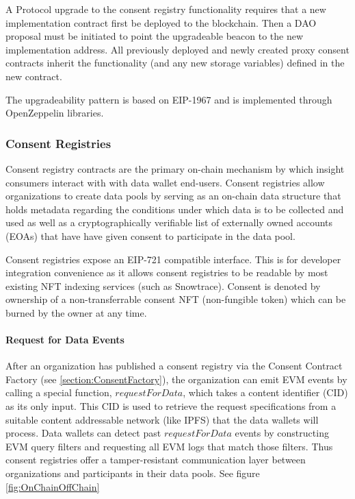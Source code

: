 A Protocol upgrade to the consent registry functionality requires that a new implementation contract first be deployed to the blockchain. Then a 
DAO proposal must be initiated to point the upgradeable beacon to the new implementation address. All previously deployed and newly created proxy 
consent contracts inherit the functionality (and any new storage variables) defined in the new contract.

The upgradeability pattern is based on EIP-1967 and is implemented through OpenZeppelin libraries.

\subsubsection{Consent Registries}
\label{section:ConsentContract}


Consent registry contracts are the primary on-chain mechanism by which insight consumers interact with with data wallet end-users. Consent 
registries allow organizations to create data pools by serving as an on-chain data structure that holds metadata regarding the conditions 
under which data is to be collected and used as well as a cryptographically verifiable list of externally owned accounts (EOAs) that have
have given consent to participate in the data pool. 

Consent registries expose an EIP-721 compatible interface. This is for developer integration convenience as it allows consent registries to 
be readable by most existing NFT indexing services (such as Snowtrace). Consent is denoted by ownership of a non-transferrable consent NFT 
(non-fungible token) which can be burned by the owner at any time. 

\paragraph{Request for Data Events}
\label{section:RequestForData}


After an organization has published a consent registry via the Consent Contract Factory (see \ref{section:ConsentFactory}), the organization can emit
EVM events by calling a special function, $requestForData$, which takes a content identifier (CID) as its only input. This CID is used to 
retrieve the request specifications from a suitable content addressable network (like IPFS) that the data wallets will process. Data wallets can detect 
past $requestForData$ events by constructing EVM query filters and requesting all EVM logs that match those filters. Thus consent registries offer a 
tamper-resistant communication layer between organizations and participants in their data pools. See figure \ref{fig:OnChainOffChain}


